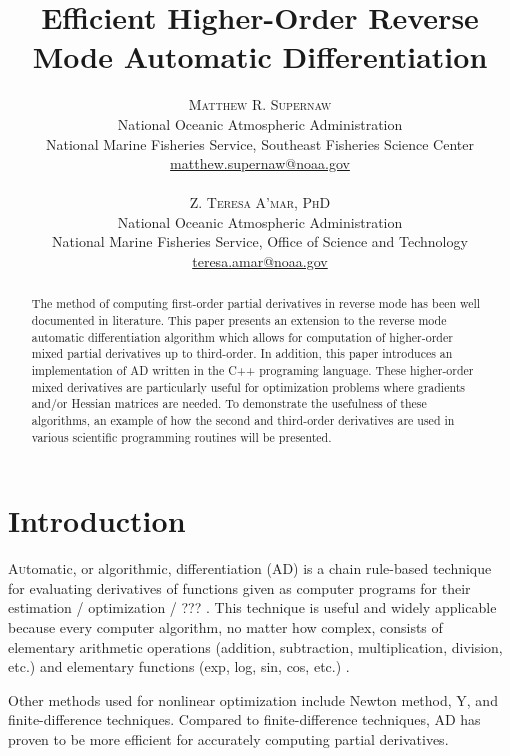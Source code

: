 \documentclass[oneside]{article}
\title{\vspace{-15mm}\fontsize{24pt}{10pt}\selectfont\textbf{Efficient Higher-Order Reverse Mode Automatic Differentiation}} %
\author{
\large
\textsc{Matthew R. Supernaw}\\[2mm] %
\normalsize National Oceanic Atmospheric Administration \\ %
\normalsize National Marine Fisheries Service, Southeast Fisheries Science Center\\ %
\normalsize \href{mailto:matthew.supernaw@noaa.gov}{matthew.supernaw@noaa.gov} \\ %
\\
\textsc{Z. Teresa A'mar, PhD}\\[2mm] %
\normalsize National Oceanic Atmospheric Administration \\ %
\normalsize National Marine Fisheries Service, Office of Science and Technology\\ %
\normalsize \href{mailto:teresa.amar@noaa.gov}{teresa.amar@noaa.gov} \\%
\vspace{-5mm}
}
\date{}
\begin{document}
\maketitle %

\thispagestyle{fancy} %


\begin{abstract}

\noindent
The method of computing first-order partial derivatives in reverse mode has been well documented in literature. This paper presents an extension to the reverse mode automatic differentiation algorithm which allows for computation of higher-order mixed partial derivatives up to third-order. In addition, this paper introduces an implementation of AD written in the C++ programing language. These higher-order mixed derivatives are particularly useful for optimization problems where gradients and/or Hessian matrices are needed. To demonstrate the usefulness of these algorithms, an example of how the second and third-order derivatives are used in various scientific programming routines will be presented.

\end{abstract}



\section{Introduction}

\lettrine[nindent=0em,lines=3]{A}utomatic, or algorithmic, differentiation (AD) is a chain rule-based technique for evaluating derivatives of functions given as computer programs for their estimation / optimization / ??? \cite{griewank}. This technique is useful and widely applicable because every computer algorithm, no matter how complex, consists of elementary arithmetic operations (addition, subtraction, multiplication, division, etc.) and elementary functions (exp, log, sin, cos, etc.) \cite{wiki_ad}.

Other methods used for nonlinear optimization include Newton method, Y, and finite-difference techniques.  Compared to finite-difference techniques, AD has proven to be more efficient for accurately computing partial derivatives. \\
\end{document}
